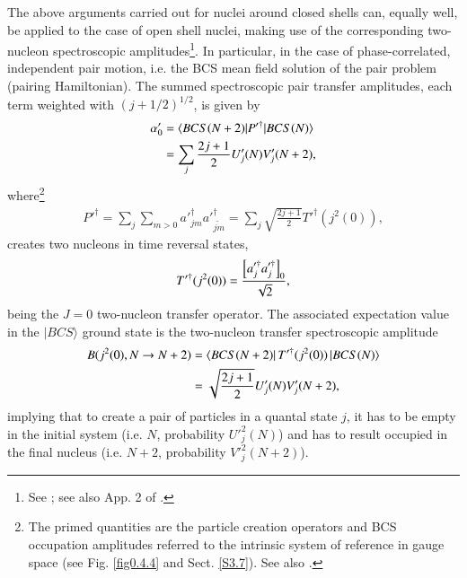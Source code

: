 The above arguments carried out for nuclei around closed shells can,  equally well, be applied to the case of open shell nuclei, making use of the corresponding two-nucleon spectroscopic amplitudes\footnote{See \cite{Yoshida:62}; see also App. 2 of \cite{Broglia:73}.}.
In particular, in the case of phase-correlated, independent pair motion, i.e. the BCS mean field solution of the pair problem (pairing Hamiltonian). The summed spectroscopic pair transfer amplitudes,  each term weighted with $(j+1/2)^{1/2}$, is given by
\begin{align}\label{eq1.2.14}
\nonumber \alpha_0'&=\langle {BCS(N+2)|P'^\dagger|BCS(N)} \rangle\\
&=\sum_{j}\frac{2j+1}{2}U'_j(N)V'_j(N+2),
\end{align}
where\footnote{The primed quantities are the particle creation operators and BCS occupation amplitudes referred to the intrinsic system of reference in gauge space (see  Fig. \ref{fig0.4.4} and Sect. \ref{S3.7}). See also \cite{Potel:13b}.}
\begin{align}\label{eq1.2.15}
P'^\dagger=\sum_j\sum_{m>0}a'^\dagger_{jm}a'^\dagger_{\widetilde{jm}}=\sum_j\sqrt{\frac{2j+1}{2}}T'^{\dagger}(j^2(0)),
\end{align}
creates two nucleons in time reversal states, 
\begin{align}\label{eq1.2.16}
T'^{\dagger}(j^2(0))=\frac{\left[a'^\dagger_ja'^\dagger_j\right]_0}{\sqrt{2}},\idx{Two-nucleon transfer!operator}\idx{Two-nucleon transfer!specific probe}
\end{align}
being the $J=0$ two-nucleon transfer operator. The associated expectation value in the $|BCS\rangle$ ground state is the two-nucleon transfer spectroscopic amplitude  
\begin{align}\label{eq1.2.17}
\nonumber B(j^2(0),N\to N+2)&=\langle {BCS(N+2)|\,T'^\dagger(j^2(0))\,|BCS(N)} \rangle\\
&=\sqrt{\frac{2j+1}{2}}U'_j(N)V'_j(N+2),
\end{align}
implying that to create a pair of particles in a quantal state $j$, it has to be empty in the initial system (i.e. $N$, probability $U'^2_j(N)$) and has to result occupied in the final nucleus (i.e. $N+2$, probability $V'^2_j(N+2)$).  




